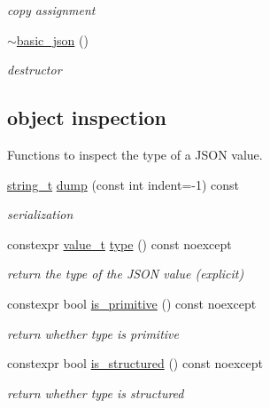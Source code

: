 \begin{DoxyCompactItemize}
\begin{DoxyCompactList}\small\item\em copy assignment \end{DoxyCompactList}\item 
\hyperlink{classnlohmann_1_1basic__json_a947b5b2a832e490858dbdddfe7085831}{$\sim$basic\+\_\+json} ()
\begin{DoxyCompactList}\small\item\em destructor \end{DoxyCompactList}\end{DoxyCompactItemize}
\subsection*{object inspection}
\label{_amgrpbbb01a37b8f261ae5b5799058dcac1a0}%
Functions to inspect the type of a J\+S\+ON value. \begin{DoxyCompactItemize}
\item 
\hyperlink{classnlohmann_1_1basic__json_ab63e618bbb0371042b1bec17f5891f42}{string\+\_\+t} \hyperlink{classnlohmann_1_1basic__json_afd4b7d7bcadc62da7c582fa36ba6805f}{dump} (const int indent=-\/1) const
\begin{DoxyCompactList}\small\item\em serialization \end{DoxyCompactList}\item 
constexpr \hyperlink{classnlohmann_1_1basic__json_a231b02148577b69a154b2ce2c87a5522}{value\+\_\+t} \hyperlink{classnlohmann_1_1basic__json_a5d466b240d0ba9f648d7fd4ff42359f5}{type} () const noexcept
\begin{DoxyCompactList}\small\item\em return the type of the J\+S\+ON value (explicit) \end{DoxyCompactList}\item 
constexpr bool \hyperlink{classnlohmann_1_1basic__json_adcd6086bac286854d5cc8b7f84d74a49}{is\+\_\+primitive} () const noexcept
\begin{DoxyCompactList}\small\item\em return whether type is primitive \end{DoxyCompactList}\item 
constexpr bool \hyperlink{classnlohmann_1_1basic__json_a873f4bff2f2a83f68fc1b5341ebdd446}{is\+\_\+structured} () const noexcept
\begin{DoxyCompactList}\small\item\em return whether type is structured \end{DoxyCompactList}\item 

\end{DoxyCompactItemize}
